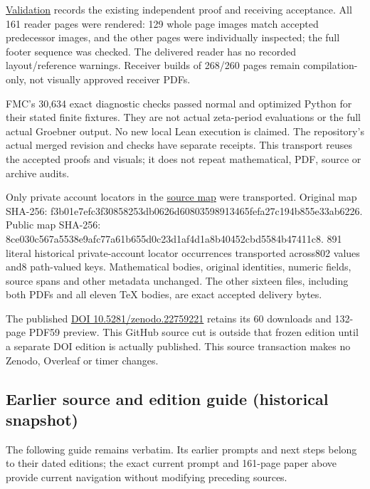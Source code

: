 \documentclass[
]{article}
\begin{document}
\href{https://github.com/KokunoYumeto/zeta-function-research-reader/blob/main/workbenches/splitzero-tandem/continuations/20260915-first-variation-continuation/12_VALIDATION.md}{Validation}
records the existing independent proof and receiving acceptance. All 161
reader pages were rendered: 129 whole page images match accepted
predecessor images, and the other pages were individually inspected; the
full footer sequence was checked. The delivered reader has no recorded
layout/reference warnings. Receiver builds of 268/260 pages remain
compilation-only, not visually approved receiver PDFs.

FMC's 30,634 exact diagnostic checks passed normal and optimized Python
for their stated finite fixtures. They are not actual zeta-period
evaluations or the full actual Groebner output. No new local Lean
execution is claimed. The repository's actual merged revision and checks
have separate receipts. This transport reuses the accepted proofs and
visuals; it does not repeat mathematical, PDF, source or archive audits.

Only private account locators in the
\href{https://github.com/KokunoYumeto/zeta-function-research-reader/blob/main/workbenches/splitzero-tandem/continuations/20260915-first-variation-continuation/11_SOURCE_MAP.json}{source
map} were transported. Original map SHA-256:
f3b01e7efc3f30858253db0626d60803598913465fefa27c194b855e33ab6226. Public
map SHA-256:
8ce030c567a5538e9afc77a61b655d0c23d1af4d1a8b40452cbd5584b47411c8. 891
literal historical private-account locator occurrences transported
across802 values and8 path-valued keys. Mathematical bodies, original
identities, numeric fields, source spans and other metadata unchanged.
The other sixteen files, including both PDFs and all eleven TeX bodies,
are exact accepted delivery bytes.

The published \href{https://doi.org/10.5281/zenodo.22759221}{DOI
10.5281/zenodo.22759221} retains its 60 downloads and 132-page PDF59
preview. This GitHub source cut is outside that frozen edition until a
separate DOI edition is actually published. This source transaction
makes no Zenodo, Overleaf or timer changes.

\subsection{Earlier source and edition guide (historical
snapshot)}\label{earlier-source-and-edition-guide-historical-snapshot-7}

The following guide remains verbatim. Its earlier prompts and next steps
belong to their dated editions; the exact current prompt and 161-page
paper above provide current navigation without modifying preceding
sources.
\end{document}
